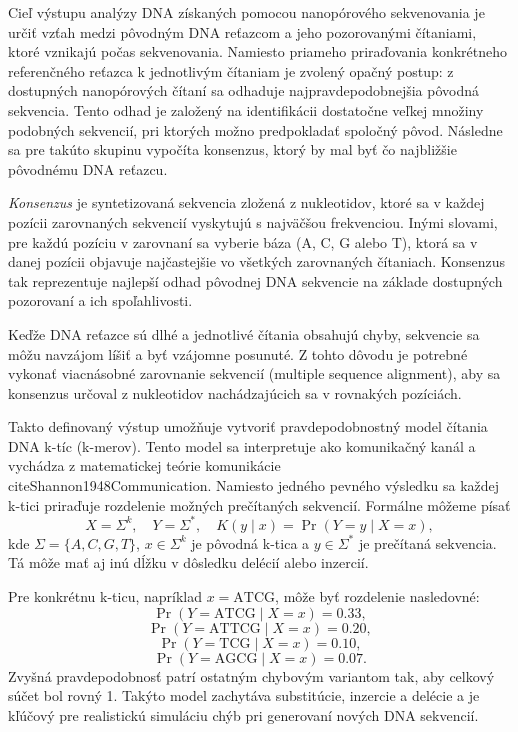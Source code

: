 Cieľ výstupu analýzy DNA získaných pomocou nanopórového sekvenovania je určiť vzťah medzi pôvodným DNA reťazcom a jeho pozorovanými čítaniami, ktoré vznikajú počas sekvenovania.
Namiesto priameho priraďovania konkrétneho referenčného reťazca k jednotlivým čítaniam je zvolený opačný postup: 
z dostupných nanopórových čítaní sa odhaduje najpravdepodobnejšia pôvodná sekvencia.
Tento odhad je založený na identifikácii dostatočne veľkej množiny podobných sekvencií, pri ktorých možno predpokladať spoločný pôvod.
Následne sa pre takúto skupinu vypočíta konsenzus, ktorý by mal byť čo najbližšie pôvodnému DNA reťazcu.

\textit{Konsenzus} je syntetizovaná sekvencia zložená z nukleotidov, ktoré sa v každej pozícii zarovnaných sekvencií vyskytujú s najväčšou frekvenciou.
Inými slovami, pre každú pozíciu v zarovnaní sa vyberie báza (A, C, G alebo T), ktorá sa v danej pozícii objavuje najčastejšie vo všetkých zarovnaných čítaniach.
Konsenzus tak reprezentuje najlepší odhad pôvodnej DNA sekvencie na základe dostupných pozorovaní a ich spoľahlivosti.

Keďže DNA reťazce sú dlhé a jednotlivé čítania obsahujú chyby, sekvencie sa môžu navzájom líšiť a byť vzájomne posunuté.
Z tohto dôvodu je potrebné vykonať viacnásobné zarovnanie sekvencií (multiple sequence alignment), aby sa konsenzus určoval z nukleotidov nachádzajúcich sa v rovnakých pozíciách.

Takto definovaný výstup umožňuje vytvoriť pravdepodobnostný model čítania DNA k-tíc (k-merov).
Tento model sa interpretuje ako komunikačný kanál a vychádza z matematickej teórie komunikácie \\cite{Shannon1948Communication}.
Namiesto jedného pevného výsledku sa každej k-tici priraďuje rozdelenie možných prečítaných sekvencií.
Formálne môžeme písať
$$
X=\Sigma^k,\quad Y=\Sigma^*,\quad K(y\mid x)=\Pr(Y=y\mid X=x),
$$
kde $\Sigma=\{A,C,G,T\}$, $x\in\Sigma^k$ je pôvodná k-tica a $y\in\Sigma^*$ je prečítaná sekvencia.
Tá môže mať aj inú dĺžku v dôsledku delécií alebo inzercií.

Pre konkrétnu k-ticu, napríklad $x=\mathrm{ATCG}$, môže byť rozdelenie nasledovné:
$$
\Pr(Y=\mathrm{ATCG}\mid X=x)=0.33,
$$
$$
\Pr(Y=\mathrm{ATTCG}\mid X=x)=0.20,
$$
$$
\Pr(Y=\mathrm{TCG}\mid X=x)=0.10,
$$
$$
\Pr(Y=\mathrm{AGCG}\mid X=x)=0.07.
$$
Zvyšná pravdepodobnosť patrí ostatným chybovým variantom tak, aby celkový súčet bol rovný 1.
Takýto model zachytáva substitúcie, inzercie a delécie a je kľúčový pre realistickú simuláciu chýb pri generovaní nových DNA sekvencií.

